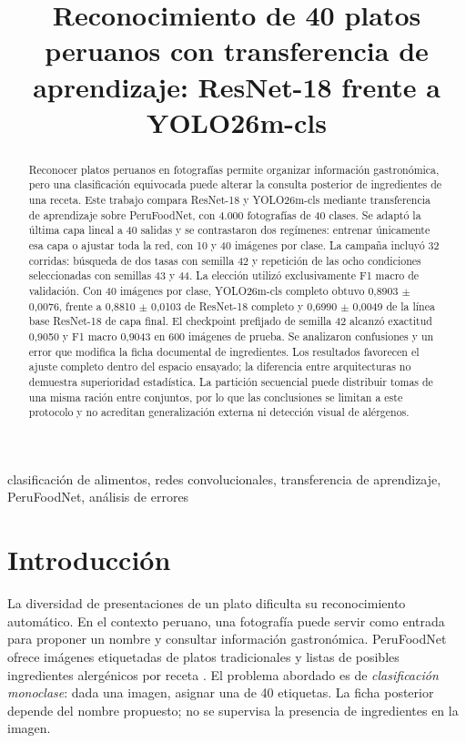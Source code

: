 \documentclass[conference]{IEEEtran}
\begin{document}
\title{Reconocimiento de 40 platos peruanos con transferencia de aprendizaje: ResNet-18 frente a YOLO26m-cls}
\author{
}
\maketitle
\begin{abstract}
Reconocer platos peruanos en fotografías permite organizar información gastronómica, pero una clasificación equivocada puede alterar la consulta posterior de ingredientes de una receta. Este trabajo compara ResNet-18 y YOLO26m-cls mediante transferencia de aprendizaje sobre PeruFoodNet, con 4.000 fotografías de 40 clases. Se adaptó la última capa lineal a 40 salidas y se contrastaron dos regímenes: entrenar únicamente esa capa o ajustar toda la red, con 10 y 40 imágenes por clase. La campaña incluyó 32 corridas: búsqueda de dos tasas con semilla 42 y repetición de las ocho condiciones seleccionadas con semillas 43 y 44. La elección utilizó exclusivamente F1 macro de validación. Con 40 imágenes por clase, YOLO26m-cls completo obtuvo 0,8903 $\pm$ 0,0076, frente a 0,8810 $\pm$ 0,0103 de ResNet-18 completo y 0,6990 $\pm$ 0,0049 de la línea base ResNet-18 de capa final. El checkpoint prefijado de semilla 42 alcanzó exactitud 0,9050 y F1 macro 0,9043 en 600 imágenes de prueba. Se analizaron confusiones y un error que modifica la ficha documental de ingredientes. Los resultados favorecen el ajuste completo dentro del espacio ensayado; la diferencia entre arquitecturas no demuestra superioridad estadística. La partición secuencial puede distribuir tomas de una misma ración entre conjuntos, por lo que las conclusiones se limitan a este protocolo y no acreditan generalización externa ni detección visual de alérgenos.
\end{abstract}
\begin{IEEEkeywords}
clasificación de alimentos, redes convolucionales, transferencia de aprendizaje, PeruFoodNet, análisis de errores
\end{IEEEkeywords}

\section{Introducción}
La diversidad de presentaciones de un plato dificulta su reconocimiento automático. En el contexto peruano, una fotografía puede servir como entrada para proponer un nombre y consultar información gastronómica. PeruFoodNet ofrece imágenes etiquetadas de platos tradicionales y listas de posibles ingredientes alergénicos por receta \cite{arzola2025}. El problema abordado es de \emph{clasificación monoclase}: dada una imagen, asignar una de 40 etiquetas. La ficha posterior depende del nombre propuesto; no se supervisa la presencia de ingredientes en la imagen.
\end{document}
